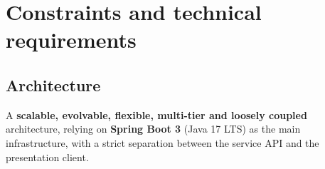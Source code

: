 \chapter{Constraints and technical requirements}

\section{Architecture}
A \textbf{scalable, evolvable, flexible, multi-tier and loosely coupled}
architecture, relying on \textbf{Spring Boot 3} (Java 17 LTS) as the main
infrastructure, with a strict separation between the service API and the
presentation client.

